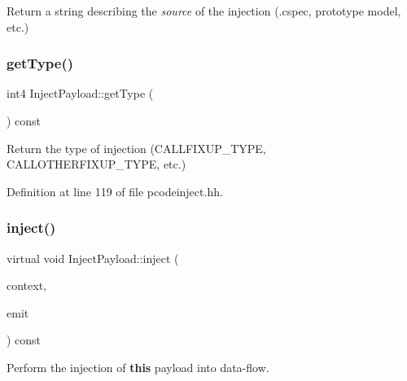 Return a string describing the {\itshape source} of the injection (.cspec, prototype model, etc.) 

\mbox{\label{class_inject_payload_af79c55beb971c8ce0a9f0740ca33503e}} 
\subsubsection{\texorpdfstring{getType()}{getType()}}
{\footnotesize\ttfamily int4 Inject\+Payload\+::get\+Type (\begin{DoxyParamCaption}\item[{void}]{ }\end{DoxyParamCaption}) const\hspace{0.3cm}{\ttfamily [inline]}}



Return the type of injection (C\+A\+L\+L\+F\+I\+X\+U\+P\+\_\+\+T\+Y\+PE, C\+A\+L\+L\+O\+T\+H\+E\+R\+F\+I\+X\+U\+P\+\_\+\+T\+Y\+PE, etc.) 



Definition at line 119 of file pcodeinject.\+hh.

\mbox{\label{class_inject_payload_aca9c322377f54e8e45c9a79e44ce0ff9}} 
\subsubsection{\texorpdfstring{inject()}{inject()}}
{\footnotesize\ttfamily virtual void Inject\+Payload\+::inject (\begin{DoxyParamCaption}\item[{\mbox{\hyperlink{class_inject_context}{Inject\+Context}} \&}]{context,  }\item[{\mbox{\hyperlink{class_pcode_emit}{Pcode\+Emit}} \&}]{emit }\end{DoxyParamCaption}) const\hspace{0.3cm}{\ttfamily [pure virtual]}}

Perform the injection of {\bfseries{this}} payload into data-\/flow.

